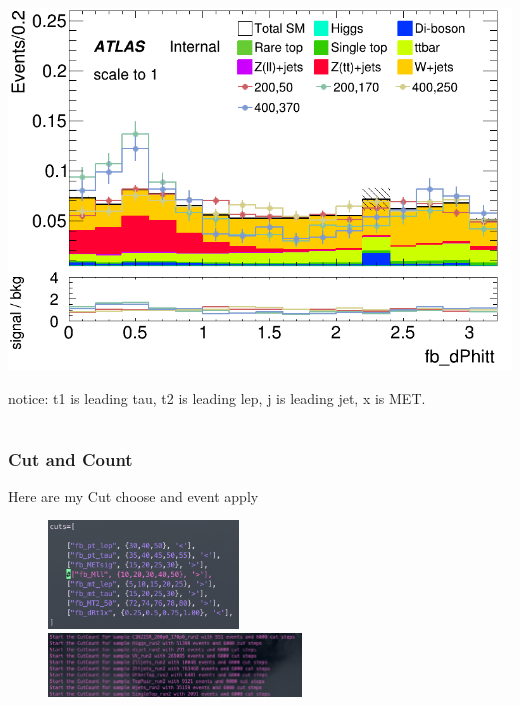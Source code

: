 \documentclass[usenames,dvipsnames]{beamer}
\begin{document}
\begin{frame}
\begin{minipage}{0.32\textwidth}
        \includegraphics[width=\textwidth]{graphics/LH_met_sig/LH_fb_dPhitt_norm.png}
    \end{minipage}
    notice: t1 is leading tau, t2 is leading lep, j is leading jet, x is MET.
\end{frame}

\section{}

\begin{frame}
	\frametitle{Cut and Count}
	Here are my Cut choose and event apply
	    \begin{figure}
        \centering
        \includegraphics[width=0.45\textwidth]{graphics/cutchoose.png}
        \hfill
        \includegraphics[width=0.6\textwidth]{graphics/eventapply.png}
    \end{figure}
\end{frame}
\end{document}

